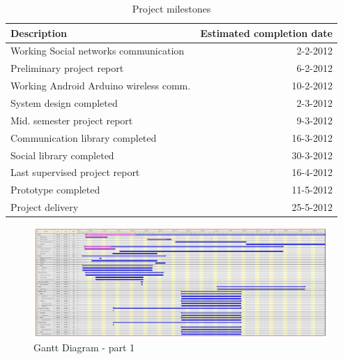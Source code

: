 \begin{table}[h]
	\begin{tabular}{| l | r |}
		\hline

		\textbf{Description} & \textbf{Estimated completion date} \\
		\hline

		Working Social networks communication & 2-2-2012 \\
		\hline

		Preliminary project report & 6-2-2012 \\
		\hline

		Working Android Arduino wireless comm. & 10-2-2012 \\
		\hline

		System design completed & 2-3-2012 \\
		\hline

		Mid. semester project report & 9-3-2012 \\
		\hline

		Communication library completed & 16-3-2012 \\
		\hline

		Social library completed & 30-3-2012 \\
		\hline

		Last supervised project report & 16-4-2012 \\
		\hline

		Prototype completed & 11-5-2012 \\
		\hline

		Project delivery & 25-5-2012 \\
		\hline

	\end{tabular}
	\caption{Project milestones}
	\label{tbl:milestone}
\end{table}


\begin{figure}[h]
\centering \includegraphics[angle=270, width=1\textwidth, trim=0mm 0mm 47.5cm 0mm, clip]{img/mgmt-gantt.pdf} \caption{Gantt Diagram - part 1}
\label{fig:mgmt-gantt-1}
\end{figure}

